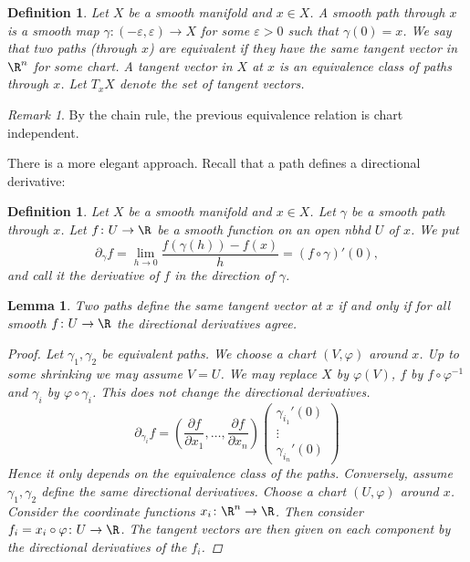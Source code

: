 \documentclass[A4paper, british]{amsart}
\theoremstyle{darkgreentheorem}
\newtheorem{lm}[thm]{Lemma}
\theoremstyle{darkbluedefinition}
\newtheorem{defn}[thm]{Definition}
\theoremstyle{darkredexample}
\theoremstyle{remark}
\newtheorem{rem}[thm]{Remark}
\newcommand{\1}{\mathbbm{1}}
\begin{document}
\begin{defn}
    Let $X$ be a smooth manifold and $x\in X$.
    A \textit{smooth path} through $x$ is a smooth map $\gamma\colon (-\varepsilon ,\varepsilon )\to X$ for some $\varepsilon >0$ such that $\gamma(0)=x$.
    We say that two paths (through $x$) are equivalent if they have the same tangent vector in $\R^{n}$ for some chart.
    A \textit{tangent vector} in $X$ at $x$ is an equivalence class of paths through $x$.
    Let $T_{x}X$ denote the set of tangent vectors.
\end{defn}

\begin{rem}
    By the chain rule, the previous equivalence relation is chart independent.
\end{rem}

There is a more elegant approach.
Recall that a path defines a directional derivative:

\begin{defn}
    Let $X$ be a smooth manifold and $x\in X$.
    Let $\gamma $ be a smooth path through $x$.
    Let $f\colon U\to \R$ be a smooth function on an open nbhd $U$ of $x$.
    We put
    \[ \partial_{\gamma}f=\lim_{h\to 0}\frac{f(\gamma(h))-f(x)}{h}=(f\circ \gamma)'(0),\]
    and call it the \textit{derivative of $f$ in the direction of $\gamma$}.
\end{defn}

\begin{lm}
    Two paths define the same tangent vector at $x$ if and only if for all smooth $f\colon U\to \R$ the directional derivatives agree.
    \begin{proof}
	Let $\gamma_{1},\gamma_{2}$ be equivalent paths.
	We choose a chart $(V,\varphi)$ around $x$.
	Up to some shrinking we may assume $V=U$.
	We may replace $X$ by $\varphi(V)$, $f$ by $f\circ \varphi^{-1}$ and $\gamma_{i}$ by $\varphi\circ \gamma_{i}$.
	This does not change the directional derivatives.
	\[ \partial_{\gamma_{i}}f=\left( \frac{\partial f}{\partial x_{1}},\ldots,\frac{\partial f}{\partial x_{n}}\right )\begin{pmatrix} \gamma_{i_{1}}'(0) \\ \vdots \\ \gamma_{i_{n}}'(0)\end{pmatrix} \]
	Hence it only depends on the equivalence class of the paths.
	Conversely, assume $\gamma_{1},\gamma_{2}$ define the same directional derivatives.
	Choose a chart $(U,\varphi)$ around $x$.
	Consider the coordinate functions $x_{i}\colon \R^{n}\to \R$.
	Then consider $f_{i}=x_{i}\circ \varphi \colon U\to \R$.
	The tangent vectors are then given on each component by the directional derivatives of the $f_{i}$.
    \end{proof}
\end{lm}
\end{document}

